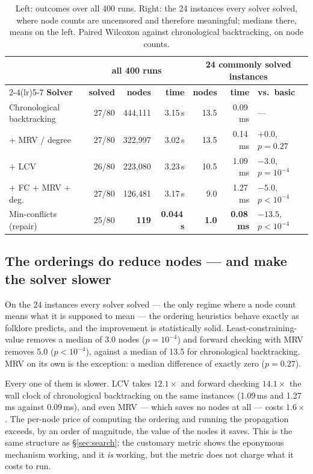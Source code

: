 \begin{table}[t]
\centering
\small
\setlength{\tabcolsep}{3.5pt}
\caption{Left: outcomes over all 400 runs. Right: the 24 instances every solver solved, where node
counts are uncensored and therefore meaningful; medians there, means on the left. Paired Wilcoxon
against chronological backtracking, on node counts.}
\label{tab:csp-solved}
\begin{tabular}{@{}lrrrrrl@{}}
\toprule
& \multicolumn{3}{c}{\textbf{all 400 runs}} & \multicolumn{3}{c}{\textbf{24 commonly solved instances}} \\
\cmidrule(lr){2-4}\cmidrule(lr){5-7}
\textbf{Solver} & \textbf{solved} & \textbf{nodes} & \textbf{time} &
\textbf{nodes} & \textbf{time} & \textbf{vs.\ basic} \\
\midrule
Chronological backtracking & 27/80 & 444,111 & 3.15\,s & 13.5 & 0.09\,ms & --- \\
\quad + MRV / degree       & 27/80 & 322,997 & 3.02\,s & 13.5 & 0.14\,ms & $+0.0$, $p = 0.27$ \\
\quad + LCV                & 26/80 & 223,080 & 3.23\,s & 10.5 & 1.09\,ms & $-3.0$, $p = 10^{-4}$ \\
\quad + FC + MRV + deg.\ & 27/80 & 126,481 & 3.17\,s & \phantom{0}9.0 & 1.27\,ms & $-5.0$, $p < 10^{-4}$ \\
\midrule
Min-conflicts (repair) & 25/80 & \textbf{119} & \textbf{0.044\,s} & \textbf{1.0} & \textbf{0.08\,ms} & $-13.5$, $p < 10^{-4}$ \\
\bottomrule
\end{tabular}
\end{table}

\subsection{The orderings do reduce nodes --- and make the solver slower}

On the 24 instances every solver solved --- the only regime where a node count means what it is
supposed to mean --- the ordering heuristics behave exactly as folklore predicts, and the
improvement is statistically solid. Least-constraining-value removes a median of 3.0 nodes
($p = 10^{-4}$) and forward checking with MRV removes 5.0 ($p < 10^{-4}$), against a median of 13.5
for chronological backtracking. MRV on its own is the exception: a median difference of exactly
zero ($p = 0.27$).

Every one of them is slower. LCV takes $12.1\times$ and forward checking $14.1\times$ the wall clock
of chronological backtracking on the same instances (1.09\,ms and 1.27\,ms against 0.09\,ms), and
even MRV --- which saves no nodes at all --- costs $1.6\times$. The per-node price of computing the
ordering and running the propagation exceeds, by an order of magnitude, the value of the nodes it
saves. This is the same structure as \S\ref{sec:search}: the customary metric shows the eponymous
mechanism working, and it \emph{is} working, but the metric does not charge what it costs to run.

